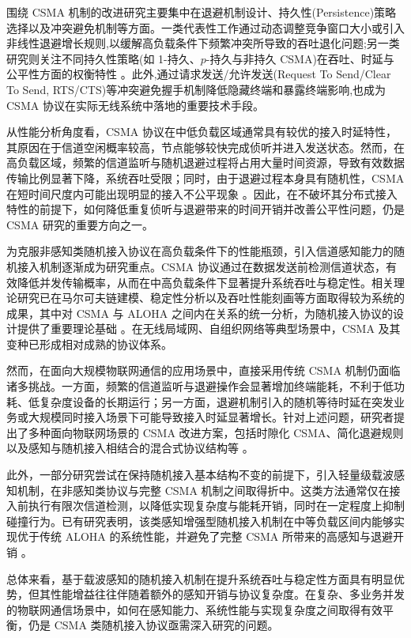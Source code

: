 围绕 CSMA 机制的改进研究主要集中在退避机制设计、持久性(Persistence)策略选择以及冲突避免机制等方面。一类代表性工作通过动态调整竞争窗口大小或引入非线性退避增长规则,以缓解高负载条件下频繁冲突所导致的吞吐退化问题;另一类研究则关注不同持久性策略(如 1-持久、$p$-持久与非持久 CSMA)在吞吐、时延与公平性方面的权衡特性 \cite{...}。此外,通过请求发送/允许发送(Request To Send/Clear To Send, RTS/CTS)等冲突避免握手机制降低隐藏终端和暴露终端影响,也成为 CSMA 协议在实际无线系统中落地的重要技术手段\cite{...}。

从性能分析角度看，CSMA 协议在中低负载区域通常具有较优的接入时延特性，其原因在于信道空闲概率较高，节点能够较快完成侦听并进入发送状态。然而，在高负载区域，频繁的信道监听与随机退避过程将占用大量时间资源，导致有效数据传输比例显著下降，系统吞吐受限；同时，由于退避过程本身具有随机性，CSMA 在短时间尺度内可能出现明显的接入不公平现象 \cite{...}。因此，在不破坏其分布式接入特性的前提下，如何降低重复侦听与退避带来的时间开销并改善公平性问题，仍是 CSMA 研究的重要方向之一。

为克服非感知类随机接入协议在高负载条件下的性能瓶颈，引入信道感知能力的随机接入机制逐渐成为研究重点。CSMA 协议通过在数据发送前检测信道状态，有效降低并发传输概率，从而在中高负载条件下显著提升系统吞吐与稳定性。相关理论研究已在马尔可夫链建模、稳定性分析以及吞吐性能刻画等方面取得较为系统的成果，其中对 CSMA 与 ALOHA 之间内在关系的统一分析，为随机接入协议的设计提供了重要理论基础 \cite{...}。在无线局域网、自组织网络等典型场景中，CSMA 及其变种已形成相对成熟的协议体系。

然而，在面向大规模物联网通信的应用场景中，直接采用传统 CSMA 机制仍面临诸多挑战。一方面，频繁的信道监听与退避操作会显著增加终端能耗，不利于低功耗、低复杂度设备的长期运行；另一方面，退避机制引入的随机等待时延在突发业务或大规模同时接入场景下可能导致接入时延显著增长。针对上述问题，研究者提出了多种面向物联网场景的 CSMA 改进方案，包括时隙化 CSMA、简化退避规则以及感知与随机接入相结合的混合式协议结构等 \cite{...}。

此外，一部分研究尝试在保持随机接入基本结构不变的前提下，引入轻量级载波感知机制，在非感知类协议与完整 CSMA 机制之间取得折中。这类方法通常仅在接入前执行有限次信道检测，以降低实现复杂度与能耗开销，同时在一定程度上抑制碰撞行为。已有研究表明，该类感知增强型随机接入机制在中等负载区间内能够实现优于传统 ALOHA 的系统性能，并避免了完整 CSMA 所带来的高感知与退避开销 \cite{...}。

总体来看，基于载波感知的随机接入机制在提升系统吞吐与稳定性方面具有明显优势，但其性能增益往往伴随着额外的感知开销与协议复杂度。在复杂、多业务并发的物联网通信场景中，如何在感知能力、系统性能与实现复杂度之间取得有效平衡，仍是 CSMA 类随机接入协议亟需深入研究的问题。


